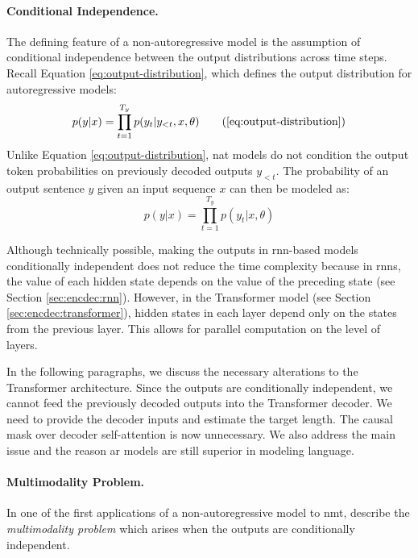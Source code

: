 \paragraph{Conditional Independence.} The defining feature of a
non-autoregressive model is the assumption of conditional independence between
the output distributions across time steps. Recall Equation
\ref{eq:output-distribution}, which defines the output distribution for
autoregressive models:
%
\begin{equation*}
  p(y|x) = \prod_{t=1}^{T_y}p(y_t|y_{<t},x,\theta)
  \tag{\ref{eq:output-distribution}}
\end{equation*}
%
Unlike Equation \ref{eq:output-distribution}, \Ac{nat} models do not condition
the output token probabilities on previously decoded outputs $y_{<t}$.  The
probability of an output sentence $y$ given an input sequence $x$ can then be
modeled as:
%
\begin{equation}
  p(y|x) = \prod_{t=1}^{T_y}p(y_t|x,\theta)
  \label{eq:nat-output-distribution}
\end{equation}

Although technically possible, making the outputs in \acs{rnn}-based models
conditionally independent does not reduce the time complexity because in
\acsp{rnn}, the value of each hidden state depends on the value of the
preceding state (see Section \ref{sec:encdec:rnn}). However, in the Transformer
model (see Section \ref{sec:encdec:transformer}), hidden states in each layer
depend only on the states from the previous layer. This allows for parallel
computation on the level of layers.

In the following paragraphs, we discuss the necessary alterations to the
Transformer architecture. Since the outputs are conditionally independent, we
cannot feed the previously decoded outputs into the Transformer decoder. We
need to provide the decoder inputs and estimate the target length. The causal
mask over decoder self-attention is now unnecessary. We also address the main
issue and the reason \ac{ar} models are still superior in modeling language.

\paragraph{Multimodality Problem.} In one of the first applications of a
non-autoregressive model to \ac{nmt}, \citet{gu2017nonautoregressive} describe
the \emph{multimodality problem} which arises when the outputs are
conditionally independent.

